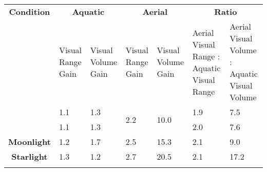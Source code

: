 \begin{tabular}{c||p{1cm}|p{1cm}||p{1cm}|p{1cm}||p{3cm}|p{3cm}}
    \textbf{Condition} & \multicolumn{2}{c||}{\textbf{Aquatic}} & \multicolumn{2}{c||}{\textbf{Aerial}}& \multicolumn{2}{c}{\textbf{Ratio}}\\\hhline{-||--||--||--}
    & Visual Range Gain &  Visual Volume Gain & Visual Range Gain & Visual Volume Gain & Aerial Visual Range : Aquatic Visual Range & Aerial Visual Volume : Aquatic Visual Volume\\\hhline{-||--||--||--}
    \multirow{2}{*}{\textbf{Daylight}} & 1.1 & 1.3 & \multirow{2}{*}{2.2} & \multirow{2}{*}{10.0} & 1.9 & 7.5\\
    & 1.1 & 1.3 & & & 2.0 & 7.6 \\\hhline{-||--||--||--}
   \textbf{Moonlight} & 1.2 & 1.7 & 2.5 & 15.3 & 2.1 & 9.0\\\hhline{-||--||--||--}
   \textbf{Starlight} & 1.3 & 1.2 & 2.7 & 20.5 & 2.1 & 17.2\\\hhline{-||--||--||--}
\end{tabular}

